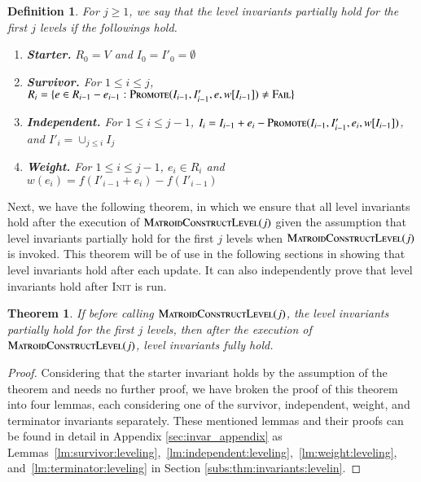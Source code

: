 \documentclass[11pt]{article}
\newtheorem{theorem}{Theorem}
\newtheorem{definition}{Definition}[section]
\newcommand{\err}{{\textsc{Fail}}}
\newcommand{\init}{\textsc{Init}}
\newcommand{\MatroidConstLevel}{\textsc{MatroidConstructLevel}}
\newcommand{\replacementTester}{\textsc{Promote}}
\begin{document}
\begin{tcolorbox}[width=\linewidth, colback=white!80!gray,boxrule=0pt,frame hidden, sharp corners]

\begin{definition}
    For $j \ge 1$, we say that 
    \emph{the level invariants partially hold for the first $j$ levels} if the followings hold.
    \begin{enumerate}
        \item \textbf{Starter.} $R_0 = V$ and $I_0 = I'_0 = \emptyset$
        \item \textbf{Survivor.}  For $1 \leq i \le j$, $R_i = \{ e \in R_{i-1} - e_{i-1}: \replacementTester{}(I_{i-1}, I'_{i-1}, e, w[I_{i-1}]) \ne \err\}$ 
        \item  \textbf{Independent.} For $1 \leq i \le j-1$, $I_i = I_{i-1} + e_i - \replacementTester{}(I_{i-1}, I'_{i-1}, e_i, w[I_{i-1}])$, and $I'_i = \cup_{j \le i} I_j$
        \item  \textbf{Weight.} For $1 \leq i \le j - 1$, $e_i \in R_i$ and  $w(e_i) = f(I'_{i-1} + e_i) - f(I'_{i-1})$
    \end{enumerate}
\end{definition}

\end{tcolorbox}


Next, we have the following theorem, in which we ensure that all level invariants hold after the execution of $\MatroidConstLevel{}(j)$ given the assumption that level invariants partially hold for the first $j$ levels when $\MatroidConstLevel{}(j)$ is invoked. 
This theorem will be of use in the following sections in showing that level invariants hold after each update. It can also independently prove that level invariants hold after \init{} is run.  


\begin{theorem}
    \label{thm:invariants:leveling}
If before calling $\MatroidConstLevel{}(j)$, the level invariants partially hold for the first $j$ levels,
then after the execution of $\MatroidConstLevel{}(j)$, level invariants fully hold.
\end{theorem}

\begin{proof}
    Considering that the starter invariant holds by the assumption of the theorem and needs no further proof, we have broken the proof of this theorem into four lemmas, each considering one of the survivor, independent, weight, and terminator invariants separately. 
    These mentioned lemmas and their proofs can be found in detail in Appendix \ref{sec:invar_appendix} as Lemmas~\ref{lm:survivor:leveling},~\ref{lm:independent:leveling},~\ref{lm:weight:leveling}, and~\ref{lm:terminator:leveling} in Section \ref{subs:thm:invariants:levelin}.
\end{proof}
\end{document}
